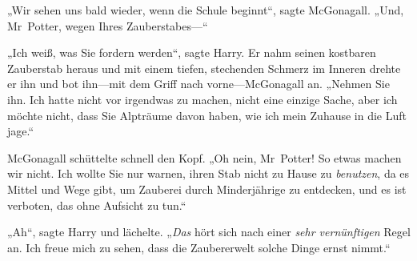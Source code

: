 „Wir sehen uns bald wieder, wenn die Schule beginnt“, sagte McGonagall. „Und, Mr~Potter, wegen Ihres Zauberstabes—“

„Ich weiß, was Sie fordern werden“, sagte Harry. Er nahm seinen kostbaren Zauberstab heraus und mit einem tiefen, stechenden Schmerz im Inneren drehte er ihn und bot ihn—mit dem Griff nach vorne—McGonagall an. „Nehmen Sie ihn. Ich hatte nicht vor irgendwas zu machen, nicht eine einzige Sache, aber ich möchte nicht, dass Sie Alpträume davon haben, wie ich mein Zuhause in die Luft jage.“

McGonagall schüttelte schnell den Kopf. „Oh nein, Mr~Potter! So etwas machen wir nicht. Ich wollte Sie nur warnen, ihren Stab nicht zu Hause zu \emph{benutzen}, da es Mittel und Wege gibt, um Zauberei durch Minderjährige zu entdecken, und es ist verboten, das ohne Aufsicht zu tun.“

„Ah“, sagte Harry und lächelte. „\emph{Das} hört sich nach einer \emph{sehr vernünftigen} Regel an. Ich freue mich zu sehen, dass die Zaubererwelt solche Dinge ernst nimmt.“

